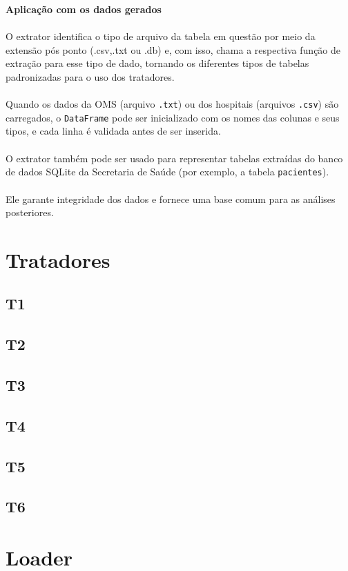 \documentclass[a4paper,12pt]{article}
\begin{document}
\textbf{Aplicação com os dados gerados}
\\
\\
O extrator identifica o tipo de arquivo da tabela em questão por meio da extensão pós ponto (.csv,.txt ou .db) e, com isso, chama a respectiva função de extração para esse tipo de dado, tornando os diferentes tipos de tabelas padronizadas para o uso dos tratadores.\\
\\
Quando os dados da OMS (arquivo \texttt{.txt}) ou dos hospitais (arquivos \texttt{.csv}) são carregados, o \texttt{DataFrame} pode ser inicializado com os nomes das colunas e seus tipos, e cada linha é validada antes de ser inserida.
\\
\\
O extrator também pode ser usado para representar tabelas extraídas do banco de dados SQLite da Secretaria de Saúde (por exemplo, a tabela \texttt{pacientes}).
\\
\\
Ele garante integridade dos dados e fornece uma base comum para as análises posteriores.


\section{Tratadores}
\subsection{T1}
\subsection{T2}
\subsection{T3}
\subsection{T4}
\subsection{T5}
\subsection{T6}


\section{Loader}
\end{document}
